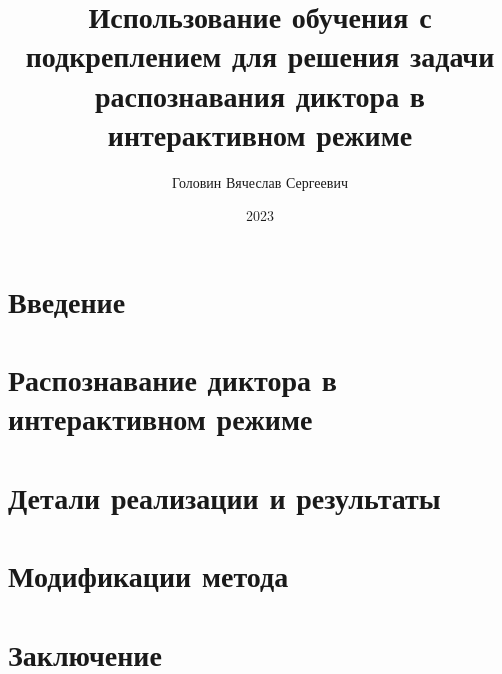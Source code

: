 \documentclass[a4paper,12pt]{article}
\author{Головин Вячеслав Сергеевич}
\title{Использование обучения с подкреплением для решения задачи распознавания
диктора в интерактивном режиме}
\date{2023}
\begin{document}
\maketitle

\tableofcontents

\newpage
\section*{Введение}\label{sec:intro}



\section{Распознавание диктора в интерактивном режиме}\label{sec:theory}



\section{Детали реализации и результаты}\label{sec:experiments}



\section{Модификации метода}\label{sec:modifications}



\section*{Заключение}



\printbibliography[title=Список литературы]
\end{document}
